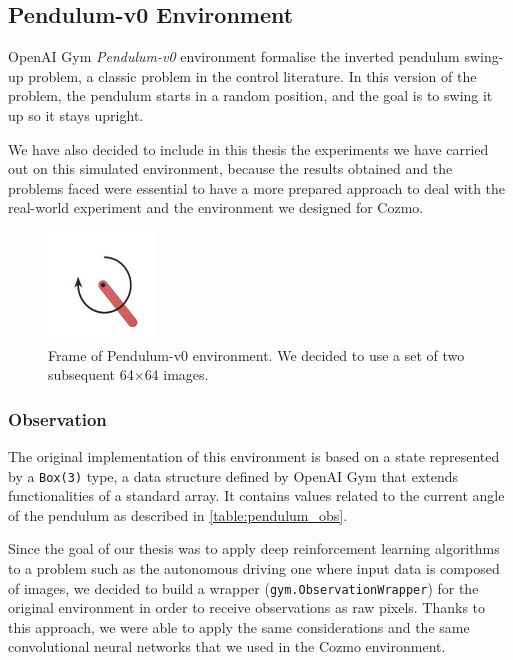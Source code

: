 \subsection{Pendulum-v0 Environment}

OpenAI Gym \textit{Pendulum-v0} environment formalise the inverted pendulum swing-up problem, a classic problem in the control literature. In this version of the problem, the pendulum starts in a random position, and the goal is to swing it up so it stays upright.

We have also decided to include in this thesis the experiments we have carried out on this simulated environment, because the results obtained and the problems faced were essential to have a more prepared approach to deal with the real-world experiment and the environment we designed for Cozmo.

\begin{figure}[ht!]
	\centering
	\includegraphics[height=0.2\paperwidth]{img/pendulum.png}
	\caption[Frame of Pendulum-v0 environment]{Frame of Pendulum-v0 environment. We decided to use a set of two subsequent 64$\times$64 images.}
	\label{fig:pendulum}
\end{figure}

\subsubsection{Observation}

The original implementation of this environment is based on a state represented by a \texttt{Box(3)} type, a data structure defined by OpenAI Gym that extends functionalities of a standard array. It contains values related to the current angle of the pendulum as described in \vref{table:pendulum_obs}.

Since the goal of our thesis was to apply deep reinforcement learning algorithms to a problem such as the autonomous driving one where input data is composed of images, we decided to build a wrapper (\texttt{gym.ObservationWrapper}) for the original environment in order to receive observations as raw pixels. Thanks to this approach, we were able to apply the same considerations and the same convolutional neural networks that we used in the Cozmo environment.


